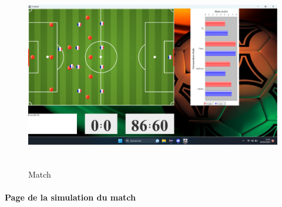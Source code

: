 \begin{figure}[h]
\centering
\includegraphics[width=12.82cm, height=8.2cm]{images/Match.png}
\caption{Match}
\label{fig:match}
\end{figure}

    \vspace{15pt}

\paragraph{Page de la simulation du match}

